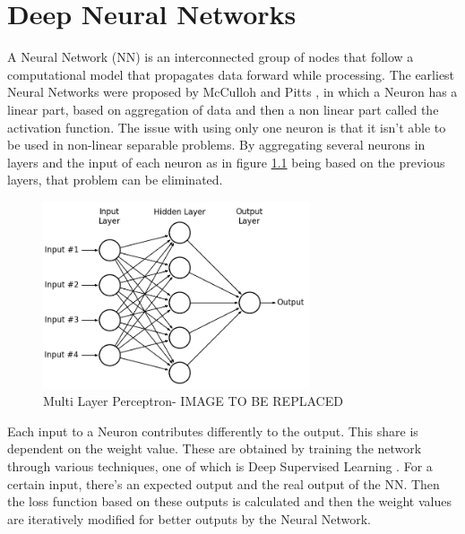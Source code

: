\chapter{Deep Neural Networks}
\label{chapter:cnn}



A Neural Network (NN) is an interconnected group of nodes that follow a computational model that propagates data forward while processing. 
The earliest Neural Networks were proposed by McCulloh and Pitts \cite{neuron:model}
, in which a Neuron has a linear part, based on aggregation of data and then a non linear part called the activation function. The issue with using only one neuron
is that it isn't able to be used in non-linear separable problems.
By aggregating several neurons in layers and the input of each neuron as in figure \ref{MLP}
being based on the previous layers, that problem can be eliminated.

\begin{figure}[!htbp]
    \centering
    \includegraphics[width=0.7\textwidth]{Figures/mlp-tobereplaced.png}
    \caption{Multi Layer Perceptron- IMAGE TO BE REPLACED}
    \label{MLP}
\end{figure} 


 Each input to a Neuron contributes differently to the output. This share is dependent on the weight value. 
 These are obtained by training the network through various techniques, one of which is Deep Supervised
 Learning \cite{deeplearning}
 . For a certain input, there's an expected output and the real output of the NN. Then the loss function based on these outputs
 is calculated and then the weight values are iteratively modified for better outputs by the Neural Network.



